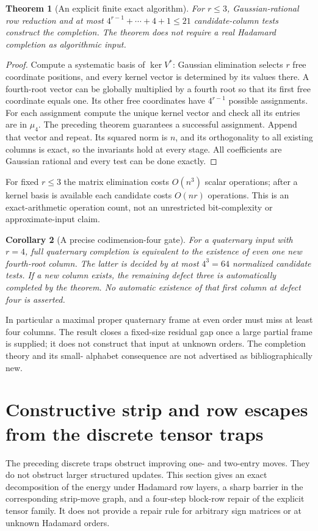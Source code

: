 \documentclass[11pt]{article}
\newtheorem{theorem}{Theorem}[section]
\newtheorem{corollary}[theorem]{Corollary}
\begin{document}
\begin{theorem}[An explicit finite exact algorithm]
For $r\le3$, Gaussian-rational row reduction and at most
$4^{r-1}+\cdots+4+1\le21$ candidate-column tests construct the
completion. The theorem does not require a real Hadamard completion
as algorithmic input.
\end{theorem}
\begin{proof}
Compute a systematic basis of $\ker V^*$: Gaussian elimination
selects $r$ free coordinate positions, and every kernel vector is
determined by its values there. A fourth-root vector can be globally
multiplied by a fourth root so that its first free coordinate equals
one. Its other free coordinates have $4^{r-1}$ possible assignments.
For each assignment compute the unique kernel vector and check all
its entries are in $\mu_4$. The preceding theorem guarantees a
successful assignment. Append that vector and repeat. Its squared
norm is $n$, and its orthogonality to all existing columns is exact,
so the invariants hold at every stage. All coefficients are Gaussian
rational and every test can be done exactly.
\end{proof}
For fixed $r\le3$ the matrix elimination costs $O(n^3)$ scalar
operations; after a kernel basis is available each candidate costs
$O(nr)$ operations. This is an exact-arithmetic operation count,
not an unrestricted bit-complexity or approximate-input claim.

\begin{corollary}[A precise codimension-four gate]
For a quaternary input with $r=4$, full quaternary completion is
equivalent to the existence of even one new fourth-root column.
The latter is decided by at most $4^3=64$ normalized candidate tests.
If a new column exists, the remaining defect three is automatically
completed by the theorem. No automatic existence of that first
column at defect four is asserted.
\end{corollary}
In particular a maximal proper quaternary frame at even order must
miss at least four columns. The result closes a fixed-size residual
gap once a large partial frame is supplied; it does not construct
that input at unknown orders. The completion theory and its small-
alphabet consequence are not advertised as bibliographically new.
\section{Constructive strip and row escapes from the discrete tensor traps}
\label{sec:exchanges-layer-escape}
The preceding discrete traps obstruct improving one- and two-entry moves.
They do not obstruct larger structured updates. This section gives an
exact decomposition of the energy under Hadamard row layers, a sharp
barrier in the corresponding strip-move graph, and a four-step block-row
repair of the explicit tensor family. It does not provide a repair rule
for arbitrary sign matrices or at unknown Hadamard orders.
\end{document}

